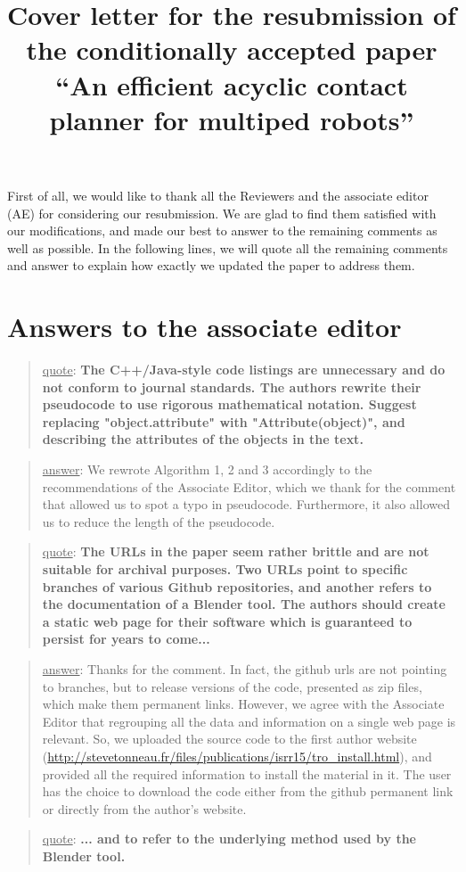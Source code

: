 \documentclass[a4paper]{article}
\author {}
\title {Cover letter for the resubmission of the conditionally accepted paper ``An efficient acyclic contact planner for multiped robots''}
\date {}
\newcommand\quot[1]{\begin{quote} \underline{quote}: \textbf{#1}\end{quote}}
\newcommand\as[1]{\begin{quote} \underline{answer}: {#1}\end{quote} }
\begin{document}
\maketitle


First of all, we would like to thank all the Reviewers and the associate editor (AE) for considering our resubmission.
We are glad to find them satisfied with our modifications, and made our best to answer to the remaining comments as well as possible.
In the following lines, we will quote all the remaining comments and answer to explain how exactly we updated the paper to address them.


\section{Answers to the associate editor}

\quot {The C++/Java-style code listings are unnecessary and do not conform
to journal standards.  The authors rewrite their pseudocode to use
rigorous mathematical notation.  Suggest replacing "object.attribute"
with "Attribute(object)", and describing the attributes of the objects
in the text.
}

\as{We rewrote Algorithm 1, 2 and 3 accordingly to the recommendations of the Associate Editor, which we thank for the comment that allowed us to spot
a typo in pseudocode. Furthermore, it also allowed us to reduce the length of the pseudocode.}
\leavevmode 
\quot {The URLs in the paper seem rather brittle and are not suitable for
archival purposes.  Two URLs point to specific branches of various
Github repositories, and another refers to the documentation of a
Blender tool.  The authors should create a static web page for their
software which is guaranteed to persist for years to come... }

\as{Thanks for the comment. In fact, the github urls are not pointing to branches, but to release versions of the code, presented as zip files, which make them permanent
links. However, we agree with the Associate Editor that regrouping all the data and information on a single web page is relevant. So, we uploaded the source code to the first author
website (\url{http://stevetonneau.fr/files/publications/isrr15/tro_install.html}), and provided all the required information to install the material in it. The user has the choice to download the code either from the github permanent link or directly from the author's website.}

\leavevmode 
\quot {... and to refer
to the underlying method used by the Blender tool.}
\end{document}
